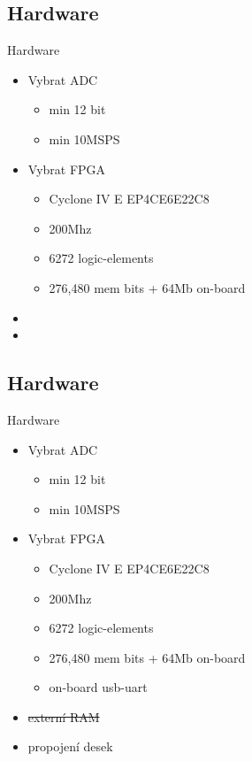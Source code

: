 \documentclass{beamer}
\begin{document}
	\subsection{Hardware}
	\begin{frame}{Hardware}
		\begin{itemize}
			\item Vybrat ADC
				\begin{itemize}
					\item min 12 bit 
					\item min 10MSPS
				\end{itemize}
			\item Vybrat FPGA
				\begin{itemize}
					\item Cyclone IV E EP4CE6E22C8
					\item 200Mhz
					\item 6272 logic-elements
					\item 276,480 mem bits + 64Mb on-board
				\end{itemize}			
			\item[]
			\item[]
		\end{itemize}
	\end{frame}


	
	\subsection{Hardware}
	\begin{frame}{Hardware}
		\begin{itemize}
			\item Vybrat ADC
				\begin{itemize}
					\item min 12 bit 
					\item min 10MSPS
				\end{itemize}
			\item Vybrat FPGA
				\begin{itemize}
					\item Cyclone IV E EP4CE6E22C8
					\item 200Mhz
					\item 6272 logic-elements
					\item 276,480 mem bits + 64Mb on-board
					\item on-board usb-uart
				\end{itemize}			
			\item \sout{externí RAM} \pause
			\item propojení desek
		\end{itemize}
	\end{frame}
	
\end{document}
